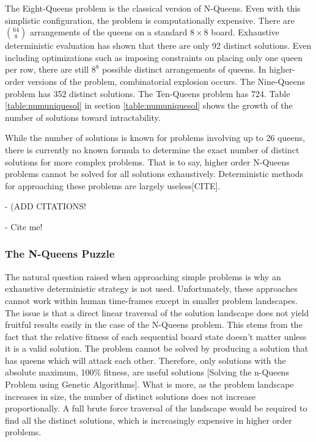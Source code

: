 \documentclass{sig-alternate}
\begin{document}
The Eight-Queens problem is the classical version of N-Queens. Even with this simplistic configuration, the problem is computationally expensive. There are {$64 \choose 8$} arrangements of the queens on a standard {$8\times{}8$} board. Exhaustive deterministic evaluation has shown that there are only 92 distinct solutions. Even including optimizations such as imposing constraints on placing only one queen per row, there are still {$8^8$} possible distinct arrangements of queens. In higher-order versions of the problem, combinatorial explosion occurs. The Nine-Queens problem has 352 distinct solutions. The Ten-Queens problem has 724. Table \ref{table:numuniquesol} in section \ref{table:numuniquesol} shows the growth of the number of solutions toward intractability. 

While the number of solutions is known for problems involving up to 26 queens, there is currently no known formula to determine the exact number of distinct solutions for more complex problems. That is to say, higher order N-Queens problems cannot be solved for all solutions exhaustively. Deterministic methods for approaching these problems are largely useless[CITE].

- (ADD CITATIONS!
  
- Cite me!\cite{crawford1992solving,homaifar1992e1,andrews2006investigation,tuson1998adapting, wolpert1997no,srinivas1994adaptive,goldberg1988genetic}

\subsubsection{The N-Queens Puzzle}
The natural question raised when approaching simple problems is why an exhaustive deterministic strategy is not used. Unfortunately, these approaches cannot work within human time-frames except in smaller problem landscapes. The issue is that a direct linear traversal of the solution landscape does not yield fruitful results easily in the case of the N-Queens problem. This stems from the fact that the relative fitness of each sequential board state doesn't matter unless it is a valid solution. The problem cannot be solved by producing a solution that has queens which will attack each other. Therefore, only solutions with the absolute maximum, 100\% fitness, are useful solutions [Solving the n-Queens Problem using Genetic Algorithms]. What is more, as the problem landscape increases in size, the number of distinct solutions does not increase proportionally. A full brute force traversal of the landscape would be required to find all the distinct solutions, which is increasingly expensive in higher order problems.
\end{document}
